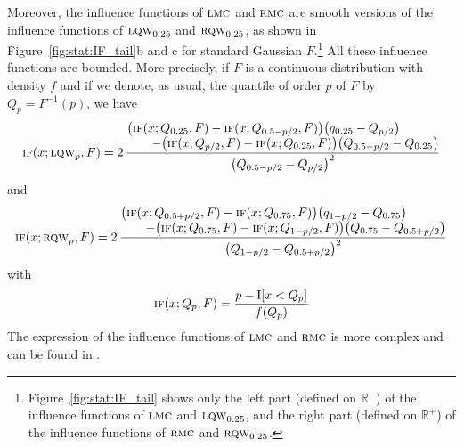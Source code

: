 Moreover, the influence functions of $\stsc{LMC}$ and $\stsc{RMC}$ are
smooth versions of the influence functions of $\stsc{LQW}_{0.25}$ and
$\stsc{RQW}_{0.25}$, as shown in Figure~\ref{fig:stat:IF_tail}b and c for
standard Gaussian $F$.\footnote{Figure~\ref{fig:stat:IF_tail} shows only the
left part (defined on ${\mathbb{R}}^{-}$) of the influence functions of
$\stsc{LMC}$ and $\stsc{LQW}_{0.25}$, and the right part (defined on
${\mathbb{R}}^{+}$) of the influence functions of $\stsc{RMC}$ and
$\stsc{RQW}_{0.25}$.} All these influence functions are bounded. More
precisely, if $F$ is a continuous distribution with density $f$ and if we
denote, as usual, the quantile of order $p$ of $F$ by $Q_p=F^{-1}(p)$, we have
\[
    \stsc{IF}(x; \stsc{LQW}_p, F) 
         = 2\, \frac{\begin{array}{@{}l@{}}
                    \left(\stsc{IF}(x; Q_{0.25}, F) - \stsc{IF}(x; Q_{0.5-p/2}, F)\right)
                                       \left(q_{0.25} - Q_{p/2}\right)\\
                    \qquad - \left(\stsc{IF}(x; Q_{p/2}, F) - \stsc{IF}(x;Q_{0.25},F)\right) 
                                       \left(Q_{0.5-p/2} - Q_{0.25}\right)
                    \end{array}}
            {\left(Q_{0.5-p/2} - Q_{p/2}\right)^2}
\]
and
\[
    \stsc{IF}(x; \stsc{RQW}_p, F) 
         = 2\, \frac{\begin{array}{@{}l@{}}
                    \left(\stsc{IF}(x; Q_{0.5+p/2}, F) - \stsc{IF}(x; Q_{0.75}, F)\right)
                                       \left(q_{1-p/2} - Q_{0.75}\right)\\
                    \qquad - \left(\stsc{IF}(x; Q_{0.75}, F) - \stsc{IF}(x;Q_{1-p/2},F)\right) 
                                       \left(Q_{0.75} - Q_{0.5+p/2}\right)
                    \end{array}}
            {\left(Q_{1-p/2} - Q_{0.5+p/2}\right)^2}
\]
with 
\[
    \stsc{IF}(x; Q_p, F) = \frac{p - \I[x<Q_p]}{f(Q_p)}
\]
The expression of the influence functions of $\stsc{LMC}$ and $\stsc{RMC}$
is more complex and can be found in \citet[p.~740--741]{brys:etal:2006}.        

